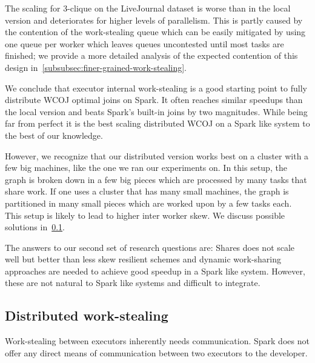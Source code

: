 The scaling for 3-clique on the LiveJournal dataset is worse than in the local version and
deteriorates for higher levels of parallelism.
This is partly caused by the contention of the work-stealing queue which can be easily mitigated
by using one queue per worker which leaves queues uncontested until most tasks are finished;
we provide a more detailed analysis of the expected contention of this design in~\cref{subsubsec:finer-grained-work-stealing}.

We conclude that executor internal work-stealing is a good starting point to fully distribute
\textsc{WCOJ} optimal joins on Spark.
It often reaches similar speedups than the local version and beats Spark's built-in joins
by two magnitudes.
While being far from perfect it is the best scaling distributed \textsc{WCOJ} on a Spark
like system to the best of our knowledge.

However, we recognize that our distributed version works best on a cluster with a few
big machines, like the one we ran our experiments on.
In this setup, the graph is broken down in a few big pieces which are processed by
many tasks that share work.
If one uses a cluster that has many small machines, the graph is partitioned in many small pieces
which are worked upon by a few tasks each.
This setup is likely to lead to higher inter worker skew.
We discuss possible solutions in~\cref{subsubsec:cluster-mode}.

The answers to our second set of research questions are: Shares does not scale well but
better than less skew resilient schemes and dynamic work-sharing approaches are needed to
achieve good speedup in a Spark like system.
However, these are not natural to Spark like systems and difficult to integrate.

\subsection{Distributed work-stealing} \label{subsubsec:cluster-mode}

Work-stealing between executors inherently needs communication.
Spark does not offer any direct means of communication between two executors to the developer.

